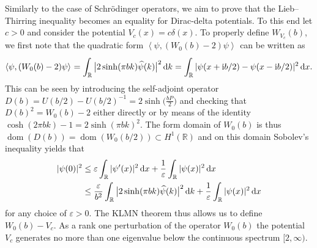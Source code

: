 \documentclass[pdftex]{sigma}%
\numberwithin{equation}{section}
\newcommand{\eps}{\varepsilon}
\newcommand{\ii}{\mathrm{i}}
\newcommand{\R}{\mathbb{R}}
\newcommand{\sclp}[2][]{{\left\langle#2\right\rangle} _{#1}}
\DeclareMathOperator{\dom}{dom}
\begin{document}
Similarly to the case of Schr\"odinger operators, we aim to prove that the Lieb--Thirring inequality becomes an equality for Dirac-delta potentials. To this end let $c>0$ and consider the potential $V_c(x)=c\delta(x)$. To properly define $W_{V_c}(b)$, we first note that the quadratic form $\sclp{\psi,(W_0(b)-2)\psi}$ can be written as
\begin{gather}
\sclp{\psi,(W_0(b)-2)\psi}=\int_{\R}\big|2\sinh(\pi b k)\widehat{\psi}(k)\big|^2 \, {\rm d} k=\int_{\R}|\psi(x+\ii b/2)-\psi(x-\ii b/2)|^2\, {\rm d} x.
\label{quadratic}
\end{gather}
This can be seen by introducing the self-adjoint operator $D(b)=U(b/2)-U(b/2)^{-1}= 2\sinh\big(\frac{bP}2\big)$ and checking that $D(b)^2=W_0(b)-2$ either directly or by means of the identity $\cosh(2\pi b k)-1\allowbreak=2\sinh(\pi b k)^2$. The form domain of $W_0(b)$ is thus $\dom(D(b))=\dom(W_0(b/2))\subset H^1(\R)$ and on this domain Sobolev's inequality yields that
\begin{align*}
|\psi(0)|^2&\le \eps\int_{\R}|\psi'(x)|^2 \, {\rm d} x+\frac1\eps\int_{\R}|\psi(x)|^2\, {\rm d} x\\
&\le\frac{\eps}{b^2}\int_{\R}\big|2\sinh(\pi b k)\widehat{\psi}(k)\big|^2\, {\rm d} k+\frac1\eps\int_{\R}|\psi(x)|^2\, {\rm d} x
\end{align*}
for any choice of $\eps>0$.
The KLMN theorem thus allows us to define $W_0(b)-V_c$.
As a rank one perturbation of the operator $W_0(b)$ the potential $V_c$ generates no more than one eigenvalue below the continuous spectrum $[2,\infty)$.
\end{document}
